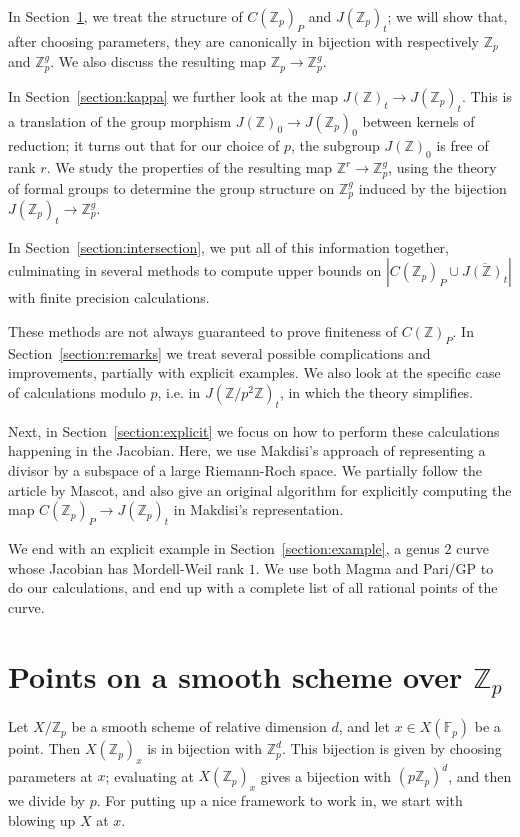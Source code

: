 \documentclass[12pt]{article}
\newcommand{\Z}{\mathbb{Z}}
\newcommand{\F}{\mathbb{F}}
\renewcommand{\angle}[1]{\hspace{-2pt}\left\langle #1 \right\rangle}
\theoremstyle{plain}
\theoremstyle{definition}
\theoremstyle{remark}
\begin{document}
In Section~\ref{section:smoothzppoints}, we treat the structure of $C(\Z_p)_P$ and $J(\Z_p)_t$; we will show that, after choosing parameters, they are canonically in bijection with respectively $\Z_p$ and $\Z_p^g$. We also discuss the resulting map $\Z_p \to \Z_p^g$.

In Section~\ref{section:kappa} we further look at the map $J(\Z)_t \to J(\Z_p)_t$. This is a translation of the group morphism $J(\Z)_0 \to J(\Z_p)_0$ between kernels of reduction; it turns out that for our choice of $p$, the subgroup $J(\Z)_0$ is free of rank $r$. We study the properties of the resulting map $\Z^r \to \Z_p^g$, using the theory of formal groups to determine the group structure on $\Z_p^g$ induced by the bijection $J(\Z_p)_t \to \Z_p^g$.

In Section~\ref{section:intersection}, we put all of this information together, culminating in several methods to compute upper bounds on $\left|C(\Z_p)_P \cup \overline{J(\Z)_t}\right|$ with finite precision calculations.

These methods are not always guaranteed to prove finiteness of $C(\Z)_P$. In Section~\ref{section:remarks} we treat several possible complications and improvements, partially with explicit examples. We also look at the specific case of calculations modulo $p$, i.e. in $J(\Z/p^2\Z)_t$, in which the theory simplifies. 

Next, in Section~\ref{section:explicit} we focus on how to perform these calculations happening in the Jacobian. Here, we use Makdisi's approach of representing a divisor by a subspace of a large Riemann-Roch space. We partially follow the article \citep{mascot2018} by Mascot, and also give an original algorithm for explicitly computing the map $C(\Z_p)_P \to J(\Z_p)_t$ in Makdisi's representation.

We end with an explicit example in Section~\ref{section:example}, a genus $2$ curve whose Jacobian has Mordell-Weil rank $1$. We use both Magma and Pari/GP to do our calculations, and end up with a complete list of all rational points of the curve.

\newpage
\section{Points on a smooth scheme over \texorpdfstring{$\Z_p$}{Z\_p}}
\label{section:smoothzppoints}
Let $X/\Z_p$ be a smooth scheme of relative dimension $d$, and let $x \in X(\F_p)$ be a point. Then $X(\Z_p)_x$ is in bijection with $\Z_p^d$. This bijection is given by choosing parameters at $x$; evaluating at $X(\Z_p)_x$ gives a bijection with $(p\Z_p)^d$, and then we divide by $p$. For putting up a nice framework to work in, we start with blowing up $X$ at $x$.
\end{document}
